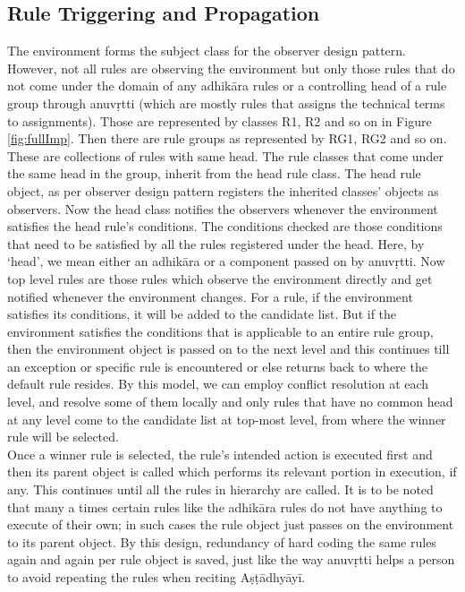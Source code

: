 \documentclass[11pt]{article}
\begin{document}
\subsection{Rule Triggering and Propagation}
The environment forms the subject class for the observer design pattern. However, not all rules are
observing the environment but only those rules that do not come under the domain of any adhikāra rules or a controlling head of a rule group through anuvṛtti (which are mostly rules that assigns the technical terms to assignments). Those are represented by classes R1, R2 and so on in Figure \ref{fig:fullImp}. Then there are rule groups as represented by RG1, RG2 and so on. These are collections of rules with same head. The rule classes that come under the same head in the group, inherit from the head rule class. The head rule object, as per observer design pattern registers the inherited classes' objects as observers. Now the head class notifies the observers whenever the environment satisfies the head rule's conditions. The conditions checked are those conditions that need to be satisfied by all the rules registered under the head.  Here, by `head', we mean either an adhikāra or a component passed on by anuvṛtti. Now top level rules are those rules which observe the environment directly and get notified whenever the environment changes. For a rule, if the environment satisfies its conditions, it will be added to the candidate list. But if the environment satisfies the conditions that is applicable to an entire rule group, then the environment object is passed on to the next level and this continues till an exception or specific rule is encountered or else returns back to where the default rule resides. By this model, we can employ conflict resolution at each level, and resolve some of them locally and only rules that have no common head at any level come to the candidate list at top-most level, from where the winner rule will be selected.
\\
Once a winner rule is selected, the rule's intended action is executed first and then its parent object is called which performs its relevant portion in execution, if any. This continues until all the rules in hierarchy are called. It is to be noted that many a times certain rules like the adhikāra rules do not have anything to execute of their own; in such cases the rule object just passes on the environment to its parent object. By this design, redundancy of hard coding the same rules again and again per rule object is saved, just like the way anuvṛtti helps a person to avoid repeating the rules when reciting Aṣṭādhyāyī.
\end{document}
